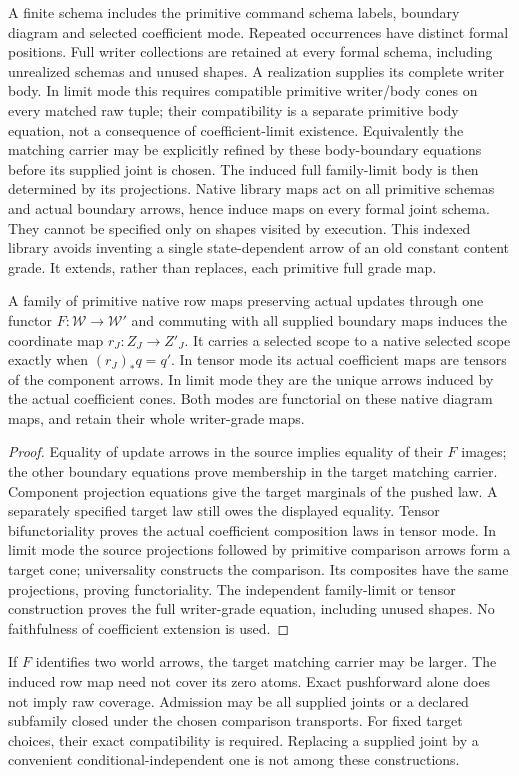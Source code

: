 \documentclass[11pt]{article}
\begin{document}
A finite schema includes the primitive command schema labels, boundary diagram and selected coefficient mode. Repeated occurrences have distinct formal positions. Full writer collections are retained at every formal schema, including unrealized schemas and unused shapes. A realization supplies its complete writer body. In limit mode this requires compatible primitive writer/body cones on every matched raw tuple; their compatibility is a separate primitive body equation, not a consequence of coefficient-limit existence. Equivalently the matching carrier may be explicitly refined by these body-boundary equations before its supplied joint is chosen. The induced full family-limit body is then determined by its projections. Native library maps act on all primitive schemas and actual boundary arrows, hence induce maps on every formal joint schema. They cannot be specified only on shapes visited by execution. This indexed library avoids inventing a single state-dependent arrow of an old constant content grade. It extends, rather than replaces, each primitive full grade map.

\begin{proposition}
A family of primitive native row maps preserving actual updates through one functor $F:\mathcal W\to\mathcal W'$ and commuting with all supplied boundary maps induces the coordinate map $r_J:Z_J\to Z'_J$. It carries a selected scope to a native selected scope exactly when $(r_J)_*q=q'$. In tensor mode its actual coefficient maps are tensors of the component arrows. In limit mode they are the unique arrows induced by the actual coefficient cones. Both modes are functorial on these native diagram maps, and retain their whole writer-grade maps.
\end{proposition}
\begin{proof}
Equality of update arrows in the source implies equality of their $F$ images; the other boundary equations prove membership in the target matching carrier. Component projection equations give the target marginals of the pushed law. A separately specified target law still owes the displayed equality. Tensor bifunctoriality proves the actual coefficient composition laws in tensor mode. In limit mode the source projections followed by primitive comparison arrows form a target cone; universality constructs the comparison. Its composites have the same projections, proving functoriality. The independent family-limit or tensor construction proves the full writer-grade equation, including unused shapes. No faithfulness of coefficient extension is used.
\end{proof}
If $F$ identifies two world arrows, the target matching carrier may be larger. The induced row map need not cover its zero atoms. Exact pushforward alone does not imply raw coverage. Admission may be all supplied joints or a declared subfamily closed under the chosen comparison transports. For fixed target choices, their exact compatibility is required. Replacing a supplied joint by a convenient conditional-independent one is not among these constructions.
\end{document}
